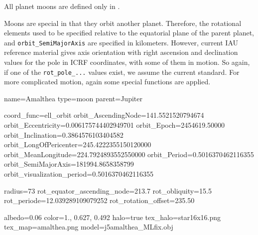 All planet moons are defined only in .

Moons are special in that they orbit another planet. Therefore, the
rotational elements used to be specified relative to the equatorial plane of the
parent planet, and \texttt{orbit\_SemiMajorAxis} are specified in kilometers. 
However, current IAU reference material gives axis orientation
with right ascension and declination values for the pole in ICRF
coordinates, with some of them in motion. So again, if one of the
\texttt{rot\_pole\_...} values exist, we assume the current
standard. For more complicated motion, again some special functions
are applied.


\begin{configfile}
[amalthea]
name=Amalthea
type=moon
parent=Jupiter

coord_func=ell_orbit
orbit_AscendingNode=141.5521520794674
orbit_Eccentricity=0.006175744402949701
orbit_Epoch=2454619.50000
orbit_Inclination=0.3864576103404582
orbit_LongOfPericenter=245.4222355150120000
orbit_MeanLongitude=224.7924893552550000
orbit_Period=0.5016370462116355
orbit_SemiMajorAxis=181994.8658358799
orbit_visualization_period=0.5016370462116355

radius=73
rot_equator_ascending_node=213.7
rot_obliquity=15.5
rot_periode=12.039289109079252
rot_rotation_offset=235.50

albedo=0.06
color=1., 0.627, 0.492
halo=true
tex_halo=star16x16.png
tex_map=amalthea.png
model=j5amalthea_MLfix.obj
\end{configfile}

